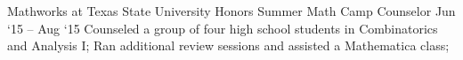 \experience
    {Mathworks at Texas State University}
    {Honors Summer Math Camp Counselor}
    {Jun `15 -- Aug `15}
    {
        Counseled a group of four high school students in Combinatorics and Analysis I;
        Ran additional review sessions and assisted a Mathematica class;
    }
